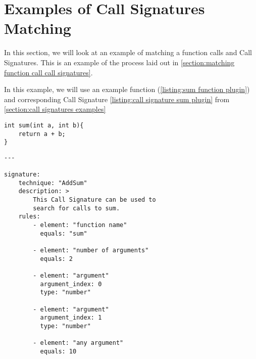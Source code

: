 \section{Examples of Call Signatures Matching}\label{section:examples searching function calls using Call Signatures}
In this section, we will look at an example of matching a function calls and Call Signatures. This is an example of the process laid out in \autoref{section:matching function call call signatures}.

In this example, we will use an example function (\autoref{listing:sum function plugin}) and corresponding Call Signature \autoref{listing:call signature sum plugin} from \autoref{section:call signatures examples}

\begin{lstlisting}[label={listing:sum function plugin}, caption={A C function that adds two integers.}, captionpos=b]
int sum(int a, int b){
    return a + b;
}
\end{lstlisting}

\begin{lstlisting}[label={listing:call signature sum plugin}, caption={A Call Signature for \texttt{sum}.}, captionpos=b]
---

signature:
    technique: "AddSum"
    description: >
        This Call Signature can be used to
        search for calls to sum.
    rules:
        - element: "function name"
          equals: "sum"

        - element: "number of arguments"
          equals: 2

        - element: "argument"
          argument_index: 0
          type: "number"

        - element: "argument"
          argument_index: 1
          type: "number"

        - element: "any argument"
          equals: 10
\end{lstlisting}

\medskip

